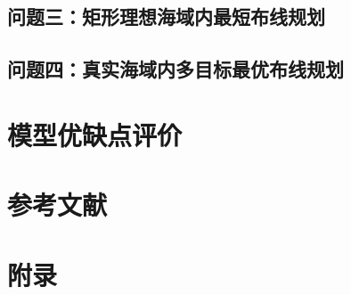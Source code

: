 \documentclass{article}
\begin{document}
	




\subsection{问题三：矩形理想海域内最短布线规划}
\subsection{问题四：真实海域内多目标最优布线规划}

\section{模型优缺点评价}

\section*{参考文献}
% 
% 
	
	
\section*{附录}
	
	
	
	
	
\end{document}
